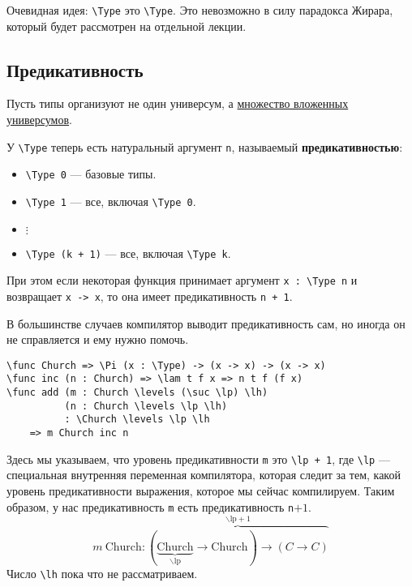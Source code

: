 Очевидная идея: \texttt{\textbackslash{}Type} это \texttt{\textbackslash{}Type}. Это невозможно в силу парадокса Жирара, который будет рассмотрен на отдельной лекции.

\subsection{Предикативность}

Пусть типы организуют не один универсум, а \underline{множество вложенных универсумов}.

У \texttt{\textbackslash{}Type} теперь есть натуральный аргумент \texttt{n}, называемый \textbf{предикативностью}:
\begin{itemize}
    \item \texttt{\textbackslash{}Type 0} --- базовые типы.
    \item \texttt{\textbackslash{}Type 1} --- все, включая \texttt{\textbackslash{}Type 0}.
    \item \(\vdots\)
    \item \texttt{\textbackslash{}Type (k + 1)} --- все, включая \texttt{\textbackslash{}Type k}.
\end{itemize}

При этом если некоторая функция принимает аргумент \texttt{x : \textbackslash{}Type n} и возвращает \texttt{x -> x}, то она имеет предикативность \texttt{n + 1}.

\begin{remark}
    В большинстве случаев компилятор выводит предикативность сам, но иногда он не справляется и ему нужно помочь.
\end{remark}

\begin{example}\itemfix
    \begin{verbatim}
\func Church => \Pi (x : \Type) -> (x -> x) -> (x -> x)
\func inc (n : Church) => \lam t f x => n t f (f x)
\func add (m : Church \levels (\suc \lp) \lh)
          (n : Church \levels \lp \lh)
          : \Church \levels \lp \lh
    => m Church inc n
    \end{verbatim}

    Здесь мы указываем, что уровень предикативности \texttt{m} это \texttt{\textbackslash{}lp + 1}, где \texttt{\textbackslash{}lp} --- специальная внутренняя переменная компилятора, которая следит за тем, какой уровень предикативности выражения, которое мы сейчас компилируем. Таким образом, у нас предикативность \texttt{m} есть предикативность \texttt{n}\(+ 1\).
    \[m\ \mathrm{Church}: \overbrace{(\underbrace{\mathrm{Church}}_{\mathrm{\backslash{}lp}} \to \mathrm{Church}) \to (C \to C)}^{\mathrm{\backslash{}lp} + 1}\]
    Число \texttt{\textbackslash{}lh} пока что не рассматриваем.
\end{example}

